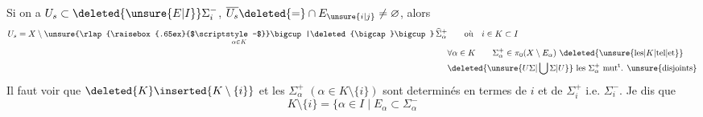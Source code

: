  Si on a $U_s\subset\deleted{\unsure{E|I}}\Sigma_i^-$, $\overline{U_s}\deleted{=}\cap E_{\unsure{i|j}}\ne\varnothing$,  alors 
\[
\begin{aligned}
U_s=X\setminus\mathop{\unsure{\rlap{\raisebox{.65ex}{$\scriptstyle-$}}\bigcup|\deleted{\bigcap}\bigcup}}\limits_{\alpha\in K}\widehat{\Sigma}_\alpha^+
&\qquad\text{où}\quad i\in K\subset I\\
&\forall\alpha\in K\qquad\Sigma_\alpha^+\in\pi_0(X\setminus E_\alpha)\ \deleted{\unsure{\text{les}|K|\text{tel}|\text{et}}}\\
&\deleted{\unsure{U\Sigma|\bigcup\Sigma|U}}\ \text{les }\Sigma_\alpha^+\ \text{mut\textsuperscript{t}. \unsure{disjoints}}
\end{aligned}
\]
Il faut voir que $\deleted{K}\inserted{K\setminus\{i\}}$ et les $\Sigma_\alpha^+$ $(\alpha\in K\setminus\{i\})$ sont determinés en termes de $i$ et de $\Sigma_i^+$ i.e. $\Sigma_i^-$. Je dis que
\[
K\setminus\{i\}=\bigl\{\alpha\in I\mid E_\alpha\subset\Sigma_\alpha^-
\]
